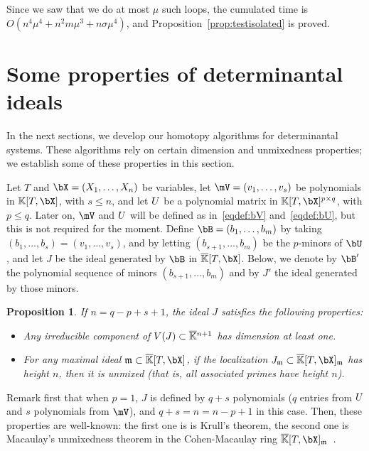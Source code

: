 \documentclass[12pt]{article}
\newtheorem{proposition}[definition]{Proposition}
\begin{document}
Since we saw that we do at most $\mu$ such loops, the cumulated time
is $O(n^4 \mu^4 + n^2 m \mu^3 + n \sigma \mu^4)$, and
Proposition~\ref{prop:testisolated} is proved.


\section{Some properties of determinantal ideals}\label{sec:check}

In the next sections, we develop our homotopy algorithms for
determinantal systems. These algorithms rely on certain dimension and
unmixedness properties; we establish some of these properties in this
section.

Let $T$ and $\bX=(X_1,\dots,X_n)$ be variables, let $\mV=(v_1,\dots,v_s)$ be
polynomials in $\KK[T,\bX]$, with $s \le n$, and let ${U}$ be a polynomial
matrix in $\KK[T,\bX]^{p \times q}$, with $p \le q$. Later on, $\mV$ and ${U}$
will be defined as in~\eqref{eqdef:bV} and~\eqref{eqdef:bU}, but this is not
required for the moment. Define $\bB=(b_1,\dots,b_m)$ by taking $(b_1,\dots,b_s)
= (v_1,\dots,v_s)$, and by letting $(b_{s+1},\dots,b_m)$ be the $p$-minors of
$\bU$, and let $J$ be the ideal generated by $\bB$ in $\KKbar[T,\bX]$. Below, we
denote by $\bB'$ the polynomial sequence of minors $(b_{s+1},\dots,b_m)$ and by
$J'$ the ideal generated by those minors.
\begin{proposition}\label{prop:KH1H2}
  If $n=q-p+s+1$, the ideal $J$ satisfies the following properties:
\begin{itemize}[leftmargin=8mm]
\item Any irreducible component of $V(J) \subset
  \overline{\mathbb{K}}{}^{n+1}$ has dimension at least one.
\item For any maximal ideal $\m \subset\KKbar[T,\bX]$,
  if the localization $J_\m \subset \KKbar[T,\bX]_\m$ has height $n$,
  then it is unmixed (that is, all associated primes have height $n$).
\end{itemize}
\end{proposition}
Remark first that when $p=1$, $J$ is defined by $q+s$ polynomials ($q$
entries from ${U}$ and $s$ polynomials from $\mV$), and $q+s=n=n-p+1$ in
this case. Then, these properties are well-known: the first one is is
Krull's theorem, the second one is Macaulay's unmixedness theorem in
the Cohen-Macaulay ring
$\KKbar[T,\bX]_\m$~\cite[Corollary~18.14]{Eisenbud95}.
\end{document}
